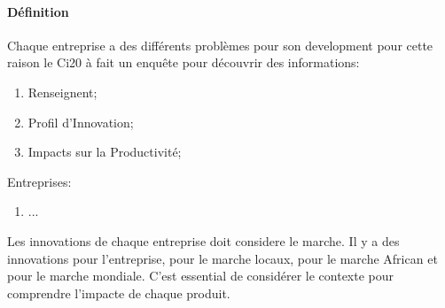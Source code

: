 \documentclass{article}
\begin{document}
\paragraph{Définition}Chaque entreprise a des différents problèmes pour son development pour cette raison le Ci20 à fait un enquête pour découvrir des informations:
\begin{enumerate}[noitemsep]
    \item Renseignent;
    \item Profil d'Innovation;
    \item Impacts sur la Productivité;
\end{enumerate}
\noindent Entreprises:
\begin{enumerate}[noitemsep]
    \item ...
\end{enumerate}
\noindent Les innovations de chaque entreprise doit considere le marche. Il y a des innovations pour l'entreprise, pour le marche locaux, pour le marche African et pour le marche mondiale. C'est essential de considérer le contexte pour comprendre l'impacte de chaque produit.\\
\end{document}
